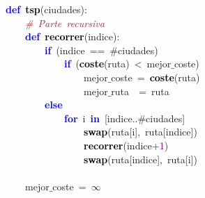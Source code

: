 \noindent
\mbox{}\textbf{\textcolor{Blue}{def}}\ \textbf{\textcolor{Black}{tsp}}\textcolor{BrickRed}{(}ciudades\textcolor{BrickRed}{):} \\
\mbox{}\ \ \ \ \textit{\textcolor{Brown}{\#\ Parte\ recursiva}} \\
\mbox{}\ \ \ \ \textbf{\textcolor{Blue}{def}}\ \textbf{\textcolor{Black}{recorrer}}\textcolor{BrickRed}{(}indice\textcolor{BrickRed}{):} \\
\mbox{}\ \ \ \ \ \ \ \ \textbf{\textcolor{Blue}{if}}\ \textcolor{BrickRed}{(}indice\ \textcolor{BrickRed}{==}\ \textcolor{BrickRed}{\#}ciudades\textcolor{BrickRed}{)} \\
\mbox{}\ \ \ \ \ \ \ \ \ \ \ \ \textbf{\textcolor{Blue}{if}}\ \textcolor{BrickRed}{(}\textbf{\textcolor{Black}{coste}}\textcolor{BrickRed}{(}ruta\textcolor{BrickRed}{)}\ \textcolor{BrickRed}{\textless{}}\ mejor$\_$coste\textcolor{BrickRed}{)} \\
\mbox{}\ \ \ \ \ \ \ \ \ \ \ \ \ \ \ \ mejor$\_$coste\ \textcolor{BrickRed}{=}\ \textbf{\textcolor{Black}{coste}}\textcolor{BrickRed}{(}ruta\textcolor{BrickRed}{)} \\
\mbox{}\ \ \ \ \ \ \ \ \ \ \ \ \ \ \ \ mejor$\_$ruta\ \ \textcolor{BrickRed}{=}\ ruta \\
\mbox{}\ \ \ \ \ \ \ \ \textbf{\textcolor{Blue}{else}} \\
\mbox{}\ \ \ \ \ \ \ \ \ \ \ \ \textbf{\textcolor{Blue}{for}}\ i\ \textbf{\textcolor{Blue}{in}}\ \textcolor{BrickRed}{[}indice\textcolor{BrickRed}{..}\textcolor{BrickRed}{\#}ciudades\textcolor{BrickRed}{]} \\
\mbox{}\ \ \ \ \ \ \ \ \ \ \ \ \ \ \ \ \textbf{\textcolor{Black}{swap}}\textcolor{BrickRed}{(}ruta\textcolor{BrickRed}{[}i\textcolor{BrickRed}{],}\ ruta\textcolor{BrickRed}{[}indice\textcolor{BrickRed}{])} \\
\mbox{}\ \ \ \ \ \ \ \ \ \ \ \ \ \ \ \ \textbf{\textcolor{Black}{recorrer}}\textcolor{BrickRed}{(}indice\textcolor{BrickRed}{+}\textcolor{Purple}{1}\textcolor{BrickRed}{)} \\
\mbox{}\ \ \ \ \ \ \ \ \ \ \ \ \ \ \ \ \textbf{\textcolor{Black}{swap}}\textcolor{BrickRed}{(}ruta\textcolor{BrickRed}{[}indice\textcolor{BrickRed}{],}\ ruta\textcolor{BrickRed}{[}i\textcolor{BrickRed}{])} \\
\mbox{} \\
\mbox{}\ \ \ \ mejor$\_$coste\ \textcolor{BrickRed}{=}\ $\infty$ \\
